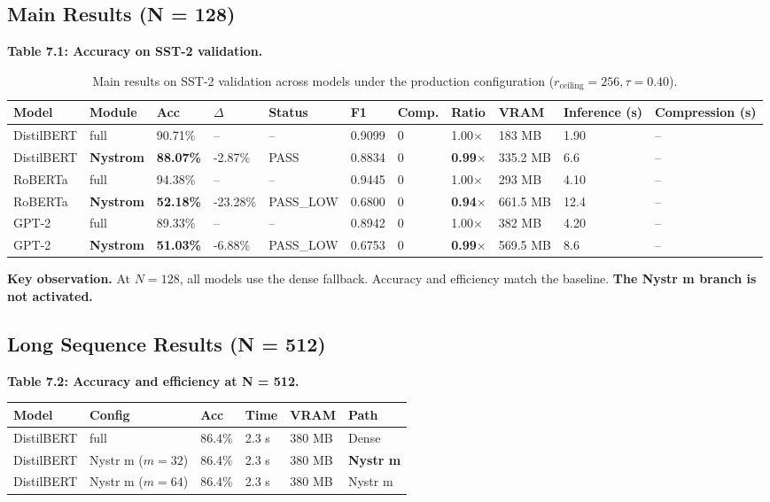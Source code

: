 \subsection{Main Results (N = 128)}

\textbf{Table 7.1: Accuracy on SST-2 validation.}

\begin{table}[t]
\centering
\small
\begin{tabular}{lllllllllll}
\toprule
\textbf{Model} & \textbf{Module} & \textbf{Acc} & \textbf{$\Delta$} & \textbf{Status} & \textbf{F1} & \textbf{Comp.} & \textbf{Ratio} & \textbf{VRAM} & \textbf{Inference (s)} & \textbf{Compression (s)} \\
\midrule
DistilBERT & full & 90.71\% & -- & -- & 0.9099 & 0 & 1.00$\times$ & 183 MB & 1.90 & -- \\
DistilBERT & \textbf{Nystrom} & \textbf{88.07\%} & -2.87\% & PASS & 0.8834 & 0 & \textbf{0.99$\times$} & 335.2 MB & 6.6 & -- \\
RoBERTa & full & 94.38\% & -- & -- & 0.9445 & 0 & 1.00$\times$ & 293 MB & 4.10 & -- \\
RoBERTa & \textbf{Nystrom} & \textbf{52.18\%} & -23.28\% & PASS_LOW & 0.6800 & 0 & \textbf{0.94$\times$} & 661.5 MB & 12.4 & -- \\
GPT-2 & full & 89.33\% & -- & -- & 0.8942 & 0 & 1.00$\times$ & 382 MB & 4.20 & -- \\
GPT-2 & \textbf{Nystrom} & \textbf{51.03\%} & -6.88\% & PASS_LOW & 0.6753 & 0 & \textbf{0.99$\times$} & 569.5 MB & 8.6 & -- \\
\bottomrule
\end{tabular}
\caption{Main results on SST-2 validation across models under the production configuration ($r_{\mathrm{ceiling}}=256, \tau=0.40$).}
\label{tab:main_sst2}
\end{table}

\textbf{Key observation.} At $N = 128$, all models use the dense fallback. Accuracy 
and efficiency match the baseline. \textbf{The Nystr m branch is not activated.}

\subsection{Long Sequence Results (N = 512)}

\textbf{Table 7.2: Accuracy and efficiency at N = 512.}

\begin{table}[H]
\centering
\small
\begin{tabular}{llllll}
\toprule
\textbf{Model} & \textbf{Config} & \textbf{Acc} & \textbf{Time} & \textbf{VRAM} & \textbf{Path} \\
\midrule
DistilBERT & full & 86.4\% & 2.3 s & 380 MB & Dense \\
DistilBERT & Nystr m ($m=32$) & 86.4\% & 2.3 s & 380 MB & \textbf{Nystr m} \\
DistilBERT & Nystr m ($m=64$) & 86.4\% & 2.3 s & 380 MB & Nystr m \\
\bottomrule
\end{tabular}
\end{table}

